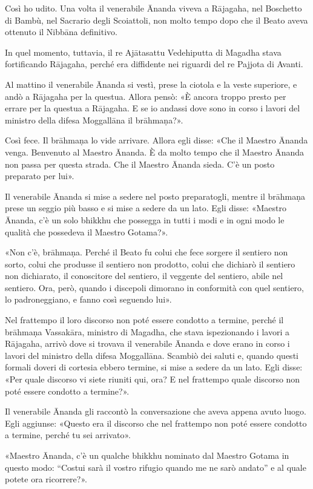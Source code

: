  Così ho udito. Una volta il venerabile Ānanda viveva a
Rājagaha, nel Boschetto di Bambù, nel Sacrario degli Scoiattoli, non
molto tempo dopo che il Beato aveva ottenuto il Nibbāna definitivo.


In quel momento, tuttavia, il re Ajātasattu Vedehiputta di Magadha stava
fortificando Rājagaha, perché era diffidente nei riguardi del re Pajjota
di Avanti.


Al mattino il venerabile Ānanda si vestì, prese la ciotola e la veste
superiore, e andò a Rājagaha per la questua. Allora pensò: «È ancora
troppo presto per errare per la questua a Rājagaha. E se io andassi dove
sono in corso i lavori del ministro della difesa Moggallāna il
brāhmaṇa?».


Così fece. Il brāhmaṇa lo vide arrivare. Allora egli disse: «Che il
Maestro Ānanda venga. Benvenuto al Maestro Ānanda. È da molto tempo che
il Maestro Ānanda non passa per questa strada. Che il Maestro Ānanda
sieda. C’è un posto preparato per lui».


Il venerabile Ānanda si mise a sedere nel posto preparatogli, mentre il
brāhmaṇa prese un seggio più basso e si mise a sedere da un lato. Egli
disse: «Maestro Ānanda, c’è un solo bhikkhu che possegga in tutti i modi
e in ogni modo le qualità che possedeva il Maestro Gotama?».


«Non c’è, brāhmaṇa. Perché il Beato fu colui che fece sorgere il
sentiero non sorto, colui che produsse il sentiero non prodotto, colui
che dichiarò il sentiero non dichiarato, il conoscitore del sentiero, il
veggente del sentiero, abile nel sentiero. Ora, però, quando i discepoli
dimorano in conformità con quel sentiero, lo padroneggiano, e fanno così
seguendo lui».


Nel frattempo il loro discorso non poté essere condotto a termine,
perché il brāhmaṇa Vassakāra, ministro di Magadha, che stava
ispezionando i lavori a Rājagaha, arrivò dove si trovava il venerabile
Ānanda e dove erano in corso i lavori del ministro della difesa
Moggallāna. Scambiò dei saluti e, quando questi formali doveri di
cortesia ebbero termine, si mise a sedere da un lato. Egli disse: «Per
quale discorso vi siete riuniti qui, ora? E nel frattempo quale discorso
non poté essere condotto a termine?».


Il venerabile Ānanda gli raccontò la conversazione che aveva appena
avuto luogo. Egli aggiunse: «Questo era il discorso che nel frattempo
non poté essere condotto a termine, perché tu sei arrivato».


«Maestro Ānanda, c’è un qualche bhikkhu nominato dal Maestro Gotama in
questo modo: “Costui sarà il vostro rifugio quando me ne sarò andato” e
al quale potete ora ricorrere?».


